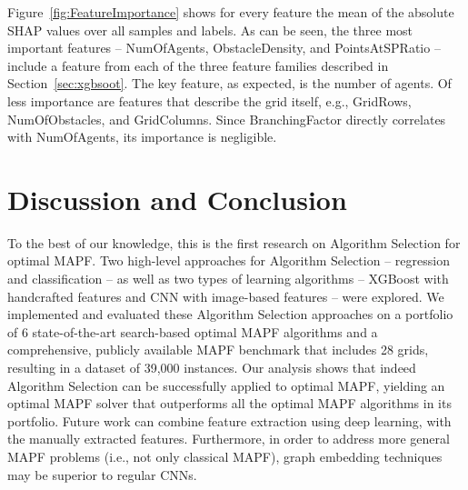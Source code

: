 \documentclass[letterpaper]{article} %
\begin{document}
Figure~\ref{fig:FeatureImportance} shows for every feature the mean of the absolute SHAP values over all samples and labels. 
As can be seen, the three most important features -- NumOfAgents, ObstacleDensity, and PointsAtSPRatio -- include a feature from each of the three feature families described in Section~\ref{sec:xgbsoot}. The key feature, as expected, is the number of agents. Of less importance are features that describe the grid itself, e.g., GridRows, NumOfObstacles, and GridColumns. Since BranchingFactor directly correlates with NumOfAgents, its importance is negligible. 



\section{Discussion and Conclusion}
To the best of our knowledge, this is the first research on Algorithm Selection for optimal MAPF. Two high-level approaches for Algorithm Selection -- regression and classification -- as well as two types of learning algorithms -- XGBoost with handcrafted features and CNN with image-based features -- were explored. 
We implemented and evaluated these Algorithm Selection approaches on a portfolio of 6 state-of-the-art search-based optimal MAPF algorithms and a comprehensive, publicly available MAPF benchmark that includes 28 grids, resulting in a dataset of 39,000 instances. Our analysis shows that indeed Algorithm Selection can be successfully applied to optimal MAPF, yielding an optimal MAPF solver that outperforms all the optimal MAPF algorithms in its portfolio. Future work can combine feature extraction using deep learning, with the manually extracted features. Furthermore, in order to address more general MAPF problems (i.e., not only classical MAPF), graph embedding techniques may be superior to regular CNNs. 





\end{document}
